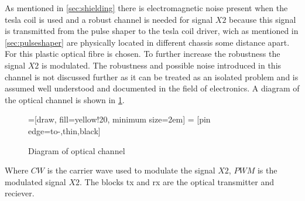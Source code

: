 As mentioned in \cref{sec:shielding} there is electromagnetic noise present when the tesla coil is used and a robust channel is needed for signal $X2$ because this signal is transmitted from the pulse shaper to the tesla coil driver, wich as mentioned in \cref{sec:pulseshaper} are physically located in different chassis some distance apart. For this plastic optical fibre is chosen. To further increase the robustness the signal $X2$ is modulated. The robustness and possible noise introduced in this channel is not discussed further as it can be treated as an isolated problem and is assumed well understood and documented in the field of electronics. A diagram of the optical channel is shown in \cref{fig:opticalchannel}.

\begin{figure}[H]
    \centering
    =[draw, fill=yellow!20, minimum size=2em]
     = [pin edge={to-,thin,black}]
    \caption{Diagram of optical channel}
    \label{fig:opticalchannel}
\end{figure}

Where $CW$ is the carrier wave used to modulate the signal $X2$, $PWM$ is the modulated signal $X2$. The blocks tx and rx are the optical transmitter and reciever.